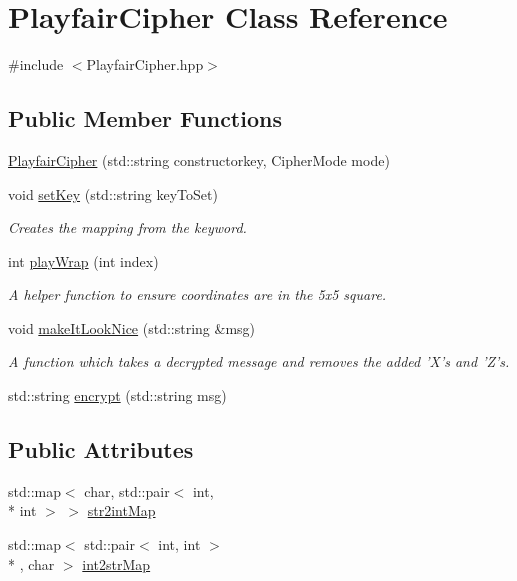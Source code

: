 \hypertarget{class_playfair_cipher}{\section{Playfair\-Cipher Class Reference}
\label{class_playfair_cipher}
}


{\ttfamily \#include $<$Playfair\-Cipher.\-hpp$>$}

\subsection*{Public Member Functions}
\begin{DoxyCompactItemize}
\item 
\hyperlink{class_playfair_cipher_a9547df4c76d947519d30355de7f00735}{Playfair\-Cipher} (std\-::string constructorkey, Cipher\-Mode mode)
\item 
void \hyperlink{class_playfair_cipher_a2c2d8f6b505f0d96cbff8124bcc00cc4}{set\-Key} (std\-::string key\-To\-Set)
\begin{DoxyCompactList}\small\item\em Creates the mapping from the keyword. \end{DoxyCompactList}\item 
int \hyperlink{class_playfair_cipher_aa16404acec63246dce3b30ea9dacb4cb}{play\-Wrap} (int index)
\begin{DoxyCompactList}\small\item\em A helper function to ensure coordinates are in the 5x5 square. \end{DoxyCompactList}\item 
\hypertarget{class_playfair_cipher_a7480bb24983949eb1e8d6ae5dec69c42}{void \hyperlink{class_playfair_cipher_a7480bb24983949eb1e8d6ae5dec69c42}{make\-It\-Look\-Nice} (std\-::string \&msg)}\label{class_playfair_cipher_a7480bb24983949eb1e8d6ae5dec69c42}

\begin{DoxyCompactList}\small\item\em A function which takes a decrypted message and removes the added 'X's and 'Z's. \end{DoxyCompactList}\item 
std\-::string \hyperlink{class_playfair_cipher_acd6697e3623547fc63332f148c49f2c6}{encrypt} (std\-::string msg)
\end{DoxyCompactItemize}
\subsection*{Public Attributes}
\begin{DoxyCompactItemize}
\item 
std\-::map$<$ char, std\-::pair$<$ int, \\*
int $>$ $>$ \hyperlink{class_playfair_cipher_a3171ced3a7a56d8fcf57e99d760db715}{str2int\-Map}
\item 
std\-::map$<$ std\-::pair$<$ int, int $>$\\*
, char $>$ \hyperlink{class_playfair_cipher_ac02d4eb28101423fe0b9b5313c0b9cd5}{int2str\-Map}
\end{DoxyCompactItemize}


